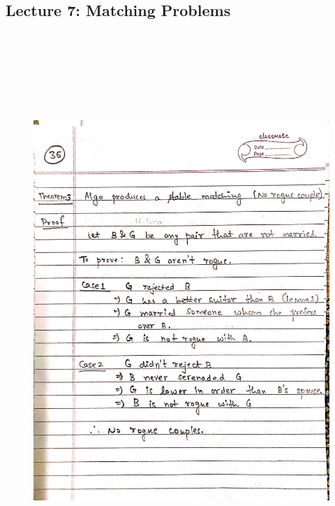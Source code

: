 \newpage
{\color{black} \subsection*{Lecture 7: Matching Problems}}
\begin{figure}[H]
    \centering
    \includegraphics[width=16cm, height=21cm]{"./MIT-6.042J/MIT-6042J-036"}
\end{figure}


